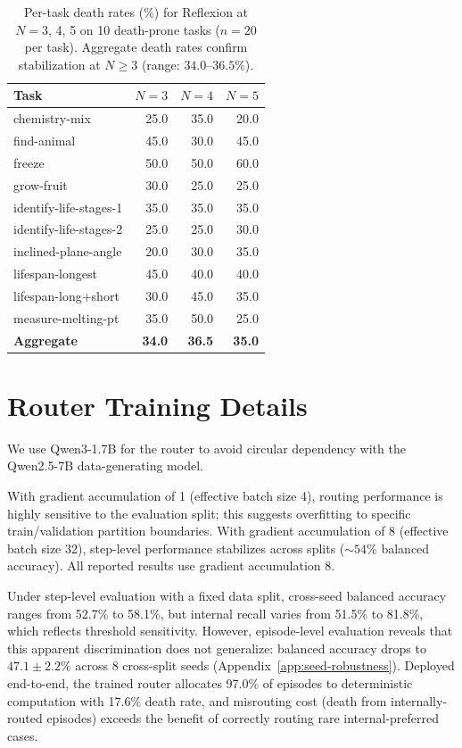 \documentclass[11pt]{article}
\begin{document}
\begin{table}[h]
\centering
\small
\caption{Per-task death rates (\%) for Reflexion at $N{=}3$, 4, 5 on 10 death-prone tasks ($n{=}20$ per task). Aggregate death rates confirm stabilization at $N \geq 3$ (range: $34.0$--$36.5\%$).}
\label{tab:dose-response-detail}
\begin{tabular}{@{}lrrr@{}}
\toprule
Task & $N{=}3$ & $N{=}4$ & $N{=}5$ \\
\midrule
chemistry-mix & 25.0 & 35.0 & 20.0 \\
find-animal & 45.0 & 30.0 & 45.0 \\
freeze & 50.0 & 50.0 & 60.0 \\
grow-fruit & 30.0 & 25.0 & 25.0 \\
identify-life-stages-1 & 35.0 & 35.0 & 35.0 \\
identify-life-stages-2 & 25.0 & 25.0 & 30.0 \\
inclined-plane-angle & 20.0 & 30.0 & 35.0 \\
lifespan-longest & 45.0 & 40.0 & 40.0 \\
lifespan-long+short & 30.0 & 45.0 & 35.0 \\
measure-melting-pt & 35.0 & 50.0 & 25.0 \\
\midrule
\textbf{Aggregate} & \textbf{34.0} & \textbf{36.5} & \textbf{35.0} \\
\bottomrule
\end{tabular}
\end{table}

\section{Router Training Details}
\label{app:router-details}

We use Qwen3-1.7B for the router to avoid circular dependency with the Qwen2.5-7B data-generating model.

With gradient accumulation of 1 (effective batch size 4), routing performance is highly sensitive to the evaluation split; this suggests overfitting to specific train/validation partition boundaries. With gradient accumulation of 8 (effective batch size 32), step-level performance stabilizes across splits (${\sim}54\%$ balanced accuracy). All reported results use gradient accumulation 8.

Under step-level evaluation with a fixed data split, cross-seed balanced accuracy ranges from 52.7\% to 58.1\%, but internal recall varies from 51.5\% to 81.8\%, which reflects threshold sensitivity. However, episode-level evaluation reveals that this apparent discrimination does not generalize: balanced accuracy drops to $47.1 \pm 2.2\%$ across 8 cross-split seeds (Appendix~\ref{app:seed-robustness}). Deployed end-to-end, the trained router allocates 97.0\% of episodes to deterministic computation with 17.6\% death rate, and misrouting cost (death from internally-routed episodes) exceeds the benefit of correctly routing rare internal-preferred cases.
\end{document}
